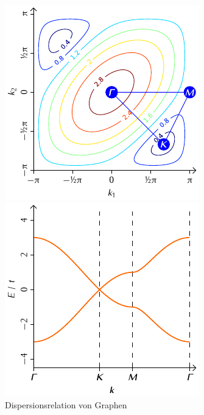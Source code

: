 \documentclass[a4paper, 10pt, twoside, openany]{book} %
\begin{document}
\begin{figure}
    \begin{minipage}[t]{0.48\textwidth}
        \includegraphics[width=\textwidth]{Abbildungen/Bandstrukturen/BZ_C2_1.pdf}
    \end{minipage}
    \hfill
    \begin{minipage}[t]{0.48\textwidth}
        \includegraphics[width=\textwidth]{Abbildungen/Bandstrukturen/C2.pdf}
    \end{minipage}
    \caption{Dispersionsrelation von Graphen}
    \label{C2}
\end{figure}
\end{document}
